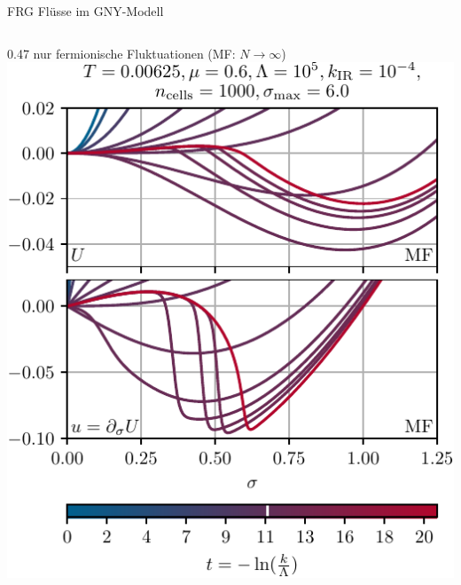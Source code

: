 \documentclass[10pt]{beamer}
\begin{document}
\begin{frame}{FRG Flüsse im GNY-Modell}
	\begin{columns}
		\begin{column}{0.47\framewidth}
			\centering
			nur fermionische Fluktuationen (MF: $N\rightarrow\infty$)\\\vspace{.2cm}
			\includegraphics[width=0.47\framewidth]{../gn/figures/flow_MF_T=0.00625,mu=0.6.pdf}
		\end{column}\hspace{.5cm}
\end{columns}
\end{frame}
\end{document}
